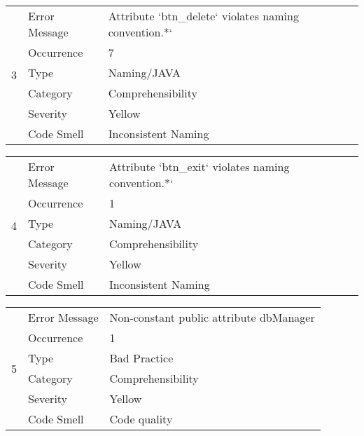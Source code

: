 \documentclass[12pt,english]{article}
\begin{document}
\begin{table}[!ht]
    \begin{tabularx}{\textwidth}{|c|l|X|}
    \hline
        \multirow{6}{*}{3} & Error Message & Attribute `btn\_delete` violates naming convention.*` \\ \cline{2-3}
        & Occurrence & 7 \\ \cline{2-3}
        & Type & Naming/JAVA \\ \cline{2-3}
        & Category & Comprehensibility \\ \cline{2-3}
        & Severity & Yellow \\ \cline{2-3}
        & Code Smell & Inconsistent Naming \\ \hline
    \end{tabularx}
\end{table}

\begin{table}[!ht]
    \begin{tabularx}{\textwidth}{|c|l|X|}
    \hline
        \multirow{6}{*}{4} & Error Message & Attribute `btn\_exit` violates naming convention.*` \\ \cline{2-3}
        & Occurrence & 1 \\ \cline{2-3}
        & Type & Naming/JAVA \\ \cline{2-3}
        & Category & Comprehensibility \\ \cline{2-3}
        & Severity & Yellow \\ \cline{2-3}
        & Code Smell & Inconsistent Naming \\ \hline
    \end{tabularx}
\end{table}

\begin{table}[!ht]
    \begin{tabularx}{\textwidth}{|c|l|X|}
    \hline
        \multirow{6}{*}{5} & Error Message & Non-constant public attribute dbManager \\ \cline{2-3}
        & Occurrence & 1 \\ \cline{2-3}
        & Type & Bad Practice \\ \cline{2-3}
        & Category & Comprehensibility \\ \cline{2-3}
        & Severity & Yellow \\ \cline{2-3}
        & Code Smell & Code quality  \\ \hline
    \end{tabularx}
\end{table}
\end{document}
